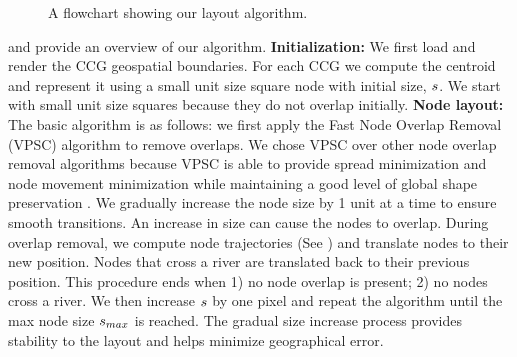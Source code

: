 {\begin{figure}[tb!]
    \caption{A flowchart showing our layout algorithm.}
    \label{fig:flowchart}
\end{figure}
}

 and  provide an overview of our algorithm. \textbf{Initialization:} We first load and render the CCG geospatial boundaries. For each CCG we compute the centroid and represent it using a small unit size square node with initial size, $ s $. We start with small unit size squares because they do not overlap initially. \textbf{Node layout:} The basic algorithm is as follows: we first apply the Fast Node Overlap Removal (VPSC) algorithm \cite{dwyer2006fast} to remove overlaps. We chose VPSC over other node overlap removal algorithms because VPSC is able to provide spread minimization and node movement minimization while maintaining a good level of global shape preservation \cite{chen2020Node}. We gradually increase the node size by 1 unit at a time to ensure smooth transitions. An increase in size can cause the nodes to overlap. During overlap removal, we compute node trajectories (See ) and translate nodes to their new position. Nodes that cross a river are translated back to their previous position. This procedure ends when 1) no node overlap is present; 2) no nodes cross a river. We then increase $ s $ by one pixel and repeat the algorithm until the max node size $ s_{max} $ is reached. The gradual size increase process provides stability to the layout and helps minimize geographical error.


